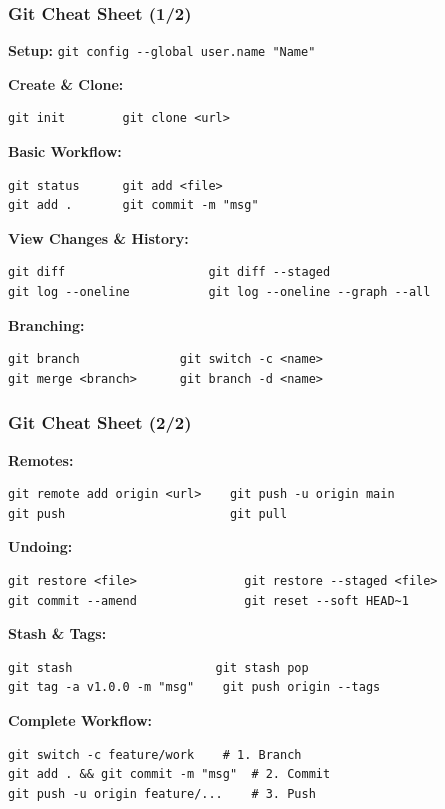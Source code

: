 \documentclass{beamer}
\begin{document}
\begin{frame}[fragile]
\frametitle{Git Cheat Sheet (1/2)}

\scriptsize
\textbf{Setup:}
\lstinline[basicstyle=\ttfamily\tiny]{git config --global user.name "Name"}

\textbf{Create \& Clone:}
\begin{lstlisting}[basicstyle=\ttfamily\tiny]
git init        git clone <url>
\end{lstlisting}

\textbf{Basic Workflow:}
\begin{lstlisting}[basicstyle=\ttfamily\tiny]
git status      git add <file>
git add .       git commit -m "msg"
\end{lstlisting}

\textbf{View Changes \& History:}
\begin{lstlisting}[basicstyle=\ttfamily\tiny]
git diff                    git diff --staged
git log --oneline           git log --oneline --graph --all
\end{lstlisting}

\textbf{Branching:}
\begin{lstlisting}[basicstyle=\ttfamily\tiny]
git branch              git switch -c <name>
git merge <branch>      git branch -d <name>
\end{lstlisting}
\end{frame}

\begin{frame}[fragile]
\frametitle{Git Cheat Sheet (2/2)}

\scriptsize
\textbf{Remotes:}
\begin{lstlisting}[basicstyle=\ttfamily\tiny]
git remote add origin <url>    git push -u origin main
git push                       git pull
\end{lstlisting}

\textbf{Undoing:}
\begin{lstlisting}[basicstyle=\ttfamily\tiny]
git restore <file>               git restore --staged <file>
git commit --amend               git reset --soft HEAD~1
\end{lstlisting}

\textbf{Stash \& Tags:}
\begin{lstlisting}[basicstyle=\ttfamily\tiny]
git stash                    git stash pop
git tag -a v1.0.0 -m "msg"    git push origin --tags
\end{lstlisting}

\textbf{Complete Workflow:}
\begin{lstlisting}[basicstyle=\ttfamily\tiny]
git switch -c feature/work    # 1. Branch
git add . && git commit -m "msg"  # 2. Commit
git push -u origin feature/...    # 3. Push
\end{lstlisting}
\end{frame}
\end{document}
